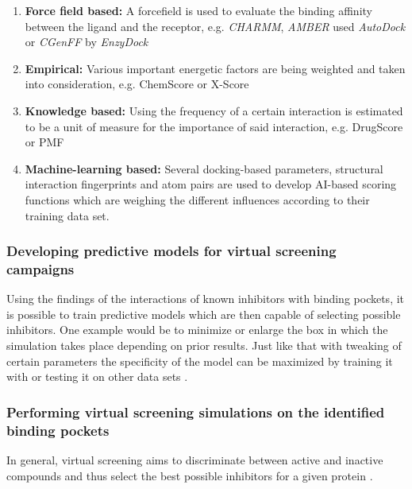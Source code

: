 \documentclass[11pt, letterpaper, titlepage]{article}
\begin{document}
\begin{enumerate} 

\item{\textbf{Force field based:} A forcefield is used to evaluate the binding 	affinity between the ligand and the receptor, e.g. \emph{CHARMM}, \emph{AMBER} used 	\emph{AutoDock} or \emph{CGenFF} by \emph{EnzyDock}} 

\item{\textbf{Empirical:} Various important energetic factors are being weighted 	 and taken into consideration, e.g. ChemScore or X-Score} 

\item{\textbf{Knowledge based:} Using the frequency of a certain interaction is 	estimated to be a unit of measure for the importance of said interaction, e.g. 	DrugScore or PMF} 

\item{\textbf{Machine-learning based:} Several docking-based parameters, 	structural interaction fingerprints and atom pairs are used to develop AI-based 	scoring functions which are weighing the different influences according to their 	training data set.} 
\end{enumerate} 
\cite{Guedes2018}

 
\subsubsection{Developing predictive models for virtual screening campaigns} 

Using the findings of the interactions of known inhibitors with binding pockets, it is possible to train predictive models which are then capable of selecting possible inhibitors. One example would be to minimize or enlarge the box in which the simulation takes place depending on prior results. Just like that with tweaking of certain parameters the specificity of the model can be maximized by training it with or testing it on other data sets \cite{Joshi2020}.  

  

\subsubsection{Performing virtual screening simulations on the identified binding pockets}

In general, virtual screening aims to discriminate between active and inactive compounds and thus select the best possible inhibitors for a given protein \cite{Joshi2020}. 
\end{document}
